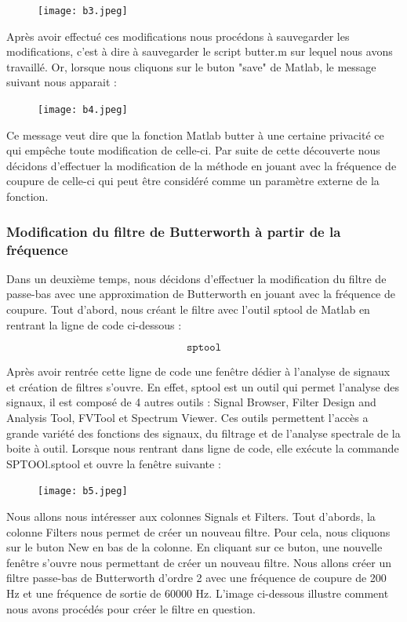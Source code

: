\documentclass[conference,onecolumn]{IEEEtran}
\begin{document}
 \begin{figure}[H]
 \centering
    \texttt{[image: b3.jpeg]}
\end{figure}


Après avoir effectué ces modifications nous procédons à sauvegarder les modifications, c'est à dire à sauvegarder le script butter.m sur lequel nous avons travaillé. Or, lorsque nous cliquons sur le buton "save" de Matlab, le message suivant nous apparait :

 \begin{figure}[H]
 \centering
    \texttt{[image: b4.jpeg]}
\end{figure}


Ce message veut dire que la fonction Matlab butter à une certaine privacité ce qui empêche toute modification de celle-ci. Par suite de cette découverte nous décidons d’effectuer la modification de la méthode en jouant avec la fréquence de coupure de celle-ci qui peut être considéré comme un paramètre externe de la fonction.

\subsubsection{Modification du filtre de Butterworth à partir de la fréquence}
Dans un deuxième temps, nous décidons d'effectuer la modification du filtre de passe-bas avec une approximation de Butterworth en jouant avec la fréquence de coupure. Tout d'abord, nous créant le filtre avec l'outil sptool de Matlab en rentrant la ligne de code ci-dessous :

\[\texttt{sptool}\]

Après avoir rentrée cette ligne de code une fenêtre dédier à l'analyse de signaux et création de filtres s'ouvre. En effet, sptool est un outil qui permet l'analyse des signaux, il est composé de 4 autres outils : Signal Browser, Filter Design and Analysis Tool, FVTool et Spectrum Viewer. Ces outils permettent l'accès a grande variété des fonctions des signaux, du filtrage et de l'analyse spectrale de la boite à outil. Lorsque nous rentrant dans ligne de code, elle exécute la commande SPTOOl.sptool et ouvre la fenêtre suivante :

 \begin{figure}[H]
 \centering
    \texttt{[image: b5.jpeg]}
\end{figure}


Nous allons nous intéresser aux colonnes Signals et Filters. Tout d'abords, la colonne Filters nous permet de créer un nouveau filtre. Pour cela, nous cliquons sur le buton New en bas de la colonne. En cliquant sur ce buton, une nouvelle fenêtre s'ouvre nous permettant de créer un nouveau filtre. Nous allons créer un filtre passe-bas de Butterworth d'ordre 2 avec une fréquence de coupure de 200 Hz et une fréquence de sortie de 60000 Hz. L'image ci-dessous illustre comment nous avons procédés pour créer le filtre en question.
\end{document}
